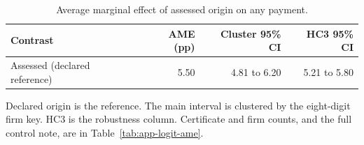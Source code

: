 \begin{table}[H]
\centering
\caption{Average marginal effect of assessed origin on any payment.}\label{tab:logit-ame}
\footnotesize
\begin{tabular}{@{}lrrr@{}}
\toprule
Contrast & AME (pp) & Cluster 95\% CI & HC3 95\% CI \\
\midrule
Assessed (declared reference) & 5.50 & 4.81 to 6.20 & 5.21 to 5.80 \\
\bottomrule
\end{tabular}

\vspace{0.4em}
\begin{minipage}{0.95\textwidth}
\footnotesize
Declared origin is the reference. The main interval is clustered by the eight-digit firm key. HC3 is the robustness column. Certificate and firm counts, and the full control note, are in Table~\ref{tab:app-logit-ame}.
\end{minipage}
\end{table}

